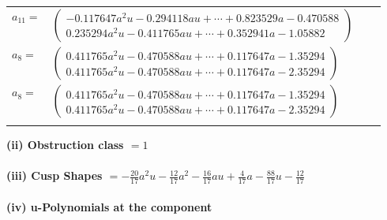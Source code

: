 \documentclass[1p]{elsarticle_modified}
\theoremstyle{definition}
\begin{document}
\begin{tabular}{m{7pt} m{180pt} m{7pt} m{180pt} }
\flushright $a_{11}=$&$\begin{pmatrix}-0.117647 a^{2} u-0.294118 a u+\cdots+0.823529 a-0.470588\\0.235294 a^{2} u-0.411765 a u+\cdots+0.352941 a-1.05882\end{pmatrix}$ \\
\flushright $a_{8}=$&$\begin{pmatrix}0.411765 a^{2} u-0.470588 a u+\cdots+0.117647 a-1.35294\\0.411765 a^{2} u-0.470588 a u+\cdots+0.117647 a-2.35294\end{pmatrix}$\\ \flushright $a_{8}=$&$\begin{pmatrix}0.411765 a^{2} u-0.470588 a u+\cdots+0.117647 a-1.35294\\0.411765 a^{2} u-0.470588 a u+\cdots+0.117647 a-2.35294\end{pmatrix}$\\&\end{tabular}
\flushleft \textbf{(ii) Obstruction class $= 1$}\\~\\
\flushleft \textbf{(iii) Cusp Shapes $= -\frac{20}{17} a^2 u-\frac{12}{17} a^2-\frac{16}{17} a u+\frac{4}{17} a-\frac{88}{17} u-\frac{12}{17}$}\\~\\
\newpage\renewcommand{\arraystretch}{1}
\flushleft \textbf{(iv) u-Polynomials at the component}\newline \\
\end{document}

